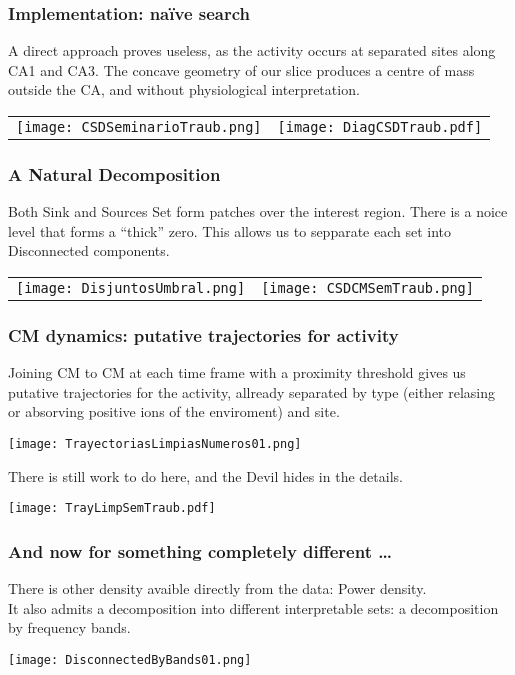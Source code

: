 \documentclass[serif]{beamer}
\begin{document}
     

  \begin{frame}
     \frametitle{Implementation: naïve search}
     A direct approach proves useless, as the activity occurs at separated
     sites along CA1 and CA3. The concave geometry of our slice
     produces a centre of mass outside the CA, and without physiological
     interpretation.

       \begin{tabular}{ c c }
      \texttt{[image: CSDSeminarioTraub.png]} &
       \texttt{[image: DiagCSDTraub.pdf]} 
     \end{tabular}
     
  \end{frame}

    
  
  \begin{frame}
     \frametitle{A Natural Decomposition}
     Both Sink and Sources Set form patches over the interest region.
     There is a noice level that forms a ``thick'' zero. This allows us
     to sepparate each set into Disconnected components.
     \begin{tabular}{ l r }
      \texttt{[image: DisjuntosUmbral.png]} &
       \texttt{[image: CSDCMSemTraub.png]} 
     \end{tabular}
  \end{frame}

  \begin{frame}
    \frametitle{CM dynamics: putative trajectories for activity}
    Joining CM to CM at each time frame with a proximity threshold gives us
    putative trajectories for the activity, allready separated by type (either
    relasing or absorving positive ions of the enviroment) and
    site.
    \begin{center}
      \texttt{[image: TrayectoriasLimpiasNumeros01.png]} 
    \end{center}
  \end{frame}

  \begin{frame}
    There is still work to do here, and the Devil hides in the details.
    \begin{center}
      \texttt{[image: TrayLimpSemTraub.pdf]}
      \end{center}
  \end{frame}


  \begin{frame}
    \frametitle{And now for something completely different \ldots}
    There is other density avaible directly from the data:
    Power density.\\
    It also admits a decomposition into different interpretable sets:
    a decomposition by frequency bands.
    \begin{center}
      \texttt{[image: DisconnectedByBands01.png]}
      \end{center}
  \end{frame}
  

 
\end{document}
